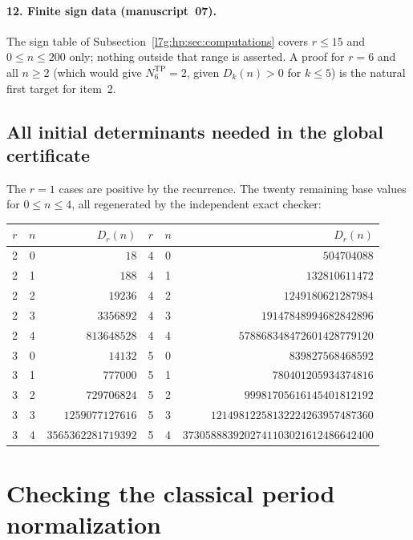 \documentclass[11pt,letterpaper]{article}
\theoremstyle{remark}\newtheorem{remark}[theorem]{Remark}
\newcommand{\TP}{\mathrm{TP}}\newcommand{\TN}{\mathrm{TN}}
\newcounter{l7gtrsavedeq}
\begin{document}
\paragraph{12. Finite sign data (manuscript~07).}
The sign table of Subsection~\ref{l7g:hp:sec:computations} covers $r\le15$
and $0\le n\le200$ only; nothing outside that range is asserted. A proof
for $r=6$ and all $n\ge2$ (which would give $N^{\TP}_6=2$, given $D_k(n)>0$
for $k\le5$) is the natural first target for item~2.

\subsection{All initial determinants needed in the global certificate}\label{l7g:hp:sec:base}
The $r=1$ cases are positive by the recurrence. The twenty remaining base
values for $0\le n\le4$, all regenerated by the independent exact checker:
\begin{center}\small
\begin{tabular}{ccr@{\qquad}ccr}
\toprule
$r$ & $n$ & $D_r(n)$ & $r$ & $n$ & $D_r(n)$\\
\midrule
2&0&$18$ & 4&0&$504704088$\\
2&1&$188$ & 4&1&$132810611472$\\
2&2&$19236$ & 4&2&$1249180621287984$\\
2&3&$3356892$ & 4&3&$19147848994682842896$\\
2&4&$813648528$ & 4&4&$578868348472601428779120$\\
\midrule
3&0&$14132$ & 5&0&$839827568468592$\\
3&1&$777000$ & 5&1&$780401205934374816$\\
3&2&$729706824$ & 5&2&$99981705616145401812192$\\
3&3&$1259077127616$ & 5&3&$12149812258132224263957487360$\\
3&4&$3565362281719392$ & 5&4&$3730588839202741103021612486642400$\\
\bottomrule
\end{tabular}
\end{center}

\setcounter{equation}{\value{l7gtrsavedeq}}
\renewcommand{\theequation}{\arabic{equation}}
\renewcommand{\theHequation}{\arabic{equation}}

\appendix
\section{Checking the classical period normalization}\label{l7g:app:beta}
\end{document}
